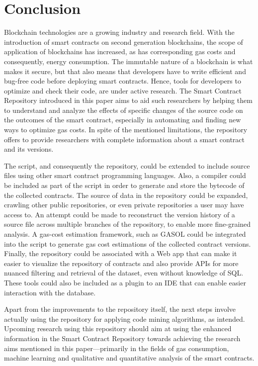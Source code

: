 \documentclass[10pt,conference]{IEEEtran}
\begin{document}
	\section{Conclusion}
	\label{sec:conclusion}
	
	Blockchain technologies are a growing industry and research field. With the introduction of smart contracts on second generation blockchains, the scope of application of blockchains has increased, as has corresponding gas costs and consequently, energy consumption. The immutable nature of a blockchain is what makes it secure, but that also means that developers have to write efficient and bug-free code before deploying smart contracts. Hence, tools for developers to optimize and check their code, are under active research. The Smart Contract Repository introduced in this paper aims to aid such researchers by helping them to understand and analyze the effects of specific changes of the source code on the outcomes of the smart contract, especially in automating and finding new ways to optimize gas costs. In spite of the mentioned limitations, the repository offers to provide researchers with complete information about a smart contract and its versions.
	
	The script, and consequently the repository, could be extended to include source files using other smart contract programming languages. Also, a compiler could be included as part of the script in order to generate and store the bytecode of the collected contracts. The source of data in the repository could be expanded, crawling other public repositories, or even private repositories a user may have access to. An attempt could be made to reconstruct the version history of a source file across multiple branches of the repository, to enable more fine-grained analysis. A gas-cost estimation framework, such as GASOL \cite{gasol} could be integrated into the script to generate gas cost estimations of the collected contract versions. Finally, the repository could be associated with a Web app that can make it easier to visualize the repository of contracts and also provide APIs for more nuanced filtering and retrieval of the dataset, even without knowledge of SQL. These tools could also be included as a plugin to an IDE that can enable easier interaction with the database.
	
	Apart from the improvements to the repository itself, the next steps involve actually using the repository for applying code mining algorithms, as intended. Upcoming research using this repository should aim at using the enhanced information in the Smart Contract Repository towards achieving the research aims mentioned in this paper---primarily in the fields of gas consumption, machine learning and qualitative and quantitative analysis of the smart contracts.
	
	
		
\end{document}
